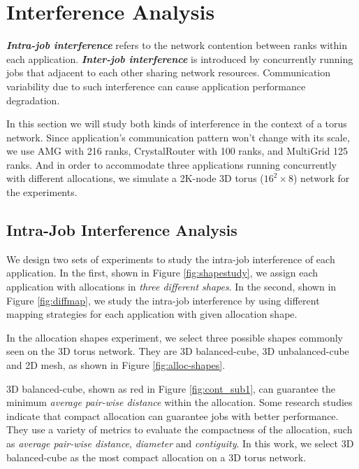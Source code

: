 \section{Interference Analysis}
\label{sec:interference}

\textbf{\emph{Intra-job interference}} refers to the network 
contention between ranks within each application. 
\textbf{\emph{Inter-job interference}} is introduced by concurrently 
running jobs that adjacent to each other sharing network resources. 
Communication variability due to such interference can 
cause application performance degradation.

In this section we will study both kinds of interference 
in the context of a torus network. 
Since application's communication pattern won't change with its scale, 
we use AMG with 216 ranks, CrystalRouter with 100 ranks, and MultiGrid 125 ranks. 
And in order to accommodate three applications running concurrently with different allocations, 
we simulate a 2K-node 3D torus ($16^{2} \times 8$) network for the experiments.


\subsection{Intra-Job Interference Analysis}
\label{sec: introjob}

We design two sets of experiments to study the 
intra-job interference of each application. 
In the first, shown in Figure \ref{fig:shapestudy}, 
we assign each application with allocations in \emph{three different shapes}. 
In the second, shown in Figure \ref{fig:diffmap}, 
we study the intra-job interference by using different 
mapping strategies for each application with given allocation shape. 

In the allocation shapes experiment, 
we select three possible shapes commonly seen on the 3D torus network. 
They are 3D balanced-cube, 3D unbalanced-cube and 2D mesh, 
as shown in Figure \ref{fig:alloc-shapes}.

3D balanced-cube, shown as red in Figure \ref{fig:cont_sub1}, 
can guarantee the minimum \emph{average pair-wise distance} within the allocation. 
Some research studies~\cite{leung,abhinav-sc13} indicate that 
compact allocation can guarantee jobs with better performance. 
They use a variety of metrics to evaluate the compactness of the allocation, 
such as \emph{average pair-wise distance}, \emph{diameter} and \emph{contiguity}. 
In this work, we select 3D balanced-cube as the most compact allocation on a 3D torus network.

